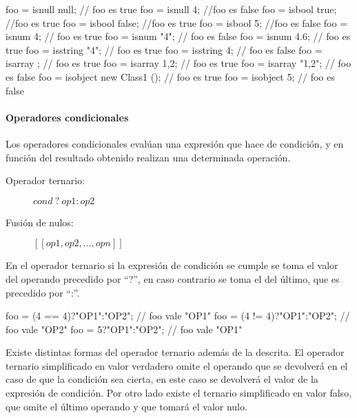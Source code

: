 \begin{myverbatim}
   foo = isnull null; // foo es true
   foo = isnull 4; //foo es false
   foo = isbool true; //foo es true
   foo = isbool false; //foo es true
   foo = isbool 5; //foo es false
   foo = isnum 4; // foo es true
   foo = isnum "4"; // foo es false
   foo = isnum 4.6; // foo es true
   foo = isstring "4"; // foo es true
   foo = isstring 4; // foo es false
   foo = isarray {}; // foo es true
   foo = isarray {1,2}; // foo es true 
   foo = isarray "{1,2}"; // foo es false
   foo = isobject new Class1 (); // foo es true
   foo = isobject 5; // foo es false 
\end{myverbatim} 


\paragraph{Operadores condicionales} \label{sec:op_cond}

Los operadores condicionales evalúan una expresión que hace de condición, y en función del resultado obtenido realizan una determinada operación.

\begin{description}
\item [Operador ternario:] $cond\ ?\ op1:op2$
\item [Fusión de nulos:] $[[ op1, op2,...,opn ]]$
\end{description} 


En el operador ternario si la expresión de condición se cumple se toma el valor del operando precedido por ``?'', en caso contrario se toma el del último, que es precedido por ``:''. \\

\begin{myverbatim}
   foo = (4 == 4)?"OP1":"OP2"; // foo vale "OP1"
   foo = (4 != 4)?"OP1":"OP2"; // foo vale "OP2"
   foo = 5?"OP1":"OP2"; // foo vale "OP1"
\end{myverbatim} 

Existe distintas formas del operador ternario además de la descrita. El operador ternario simplificado en valor verdadero omite el operando que se devolverá en el caso de que la condición 
sea cierta, en este caso se devolverá el valor de la expresión de condición. Por otro lado existe el ternario simplificado en valor falso, que omite el último operando
y que tomará el valor nulo. \\

